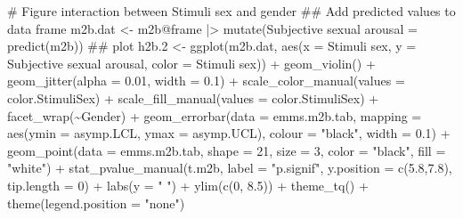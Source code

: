 \documentclass[
  bookmarksnumbered]{article}
\newenvironment{Shaded}{\begin{snugshade}}{\end{snugshade}}
\newcommand{\AttributeTok}[1]{\textcolor[rgb]{0.80,0.80,0.80}{#1}}
\newcommand{\CommentTok}[1]{\textcolor[rgb]{0.50,0.62,0.50}{#1}}
\newcommand{\DecValTok}[1]{\textcolor[rgb]{0.86,0.86,0.80}{#1}}
\newcommand{\DocumentationTok}[1]{\textcolor[rgb]{0.50,0.62,0.50}{#1}}
\newcommand{\FloatTok}[1]{\textcolor[rgb]{0.75,0.75,0.82}{#1}}
\newcommand{\FunctionTok}[1]{\textcolor[rgb]{0.94,0.94,0.56}{#1}}
\newcommand{\NormalTok}[1]{\textcolor[rgb]{0.80,0.80,0.80}{#1}}
\newcommand{\OtherTok}[1]{\textcolor[rgb]{0.94,0.94,0.56}{#1}}
\newcommand{\SpecialCharTok}[1]{\textcolor[rgb]{0.86,0.64,0.64}{#1}}
\newcommand{\StringTok}[1]{\textcolor[rgb]{0.80,0.58,0.58}{#1}}
\begin{document}
\begin{Shaded}
\begin{Highlighting}[]
\CommentTok{\# Figure interaction between Stimuli sex and gender}
\DocumentationTok{\#\# Add predicted values to data frame}
\NormalTok{m2b.dat }\OtherTok{\textless{}{-}}\NormalTok{ m2b}\SpecialCharTok{@}\NormalTok{frame }\SpecialCharTok{|\textgreater{}} 
  \FunctionTok{mutate}\NormalTok{(}\StringTok{\textasciigrave{}}\AttributeTok{Subjective sexual arousal}\StringTok{\textasciigrave{}} \OtherTok{=} \FunctionTok{predict}\NormalTok{(m2b))}
\DocumentationTok{\#\# plot}
\NormalTok{h2b}\FloatTok{.2} \OtherTok{\textless{}{-}} \FunctionTok{ggplot}\NormalTok{(m2b.dat, }\FunctionTok{aes}\NormalTok{(}\AttributeTok{x =} \StringTok{\textasciigrave{}}\AttributeTok{Stimuli sex}\StringTok{\textasciigrave{}}\NormalTok{, }
                             \AttributeTok{y =} \StringTok{\textasciigrave{}}\AttributeTok{Subjective sexual arousal}\StringTok{\textasciigrave{}}\NormalTok{, }
                             \AttributeTok{color =} \StringTok{\textasciigrave{}}\AttributeTok{Stimuli sex}\StringTok{\textasciigrave{}}\NormalTok{)) }\SpecialCharTok{+}
  \FunctionTok{geom\_violin}\NormalTok{() }\SpecialCharTok{+}
  \FunctionTok{geom\_jitter}\NormalTok{(}\AttributeTok{alpha =} \FloatTok{0.01}\NormalTok{, }\AttributeTok{width =} \FloatTok{0.1}\NormalTok{) }\SpecialCharTok{+}
  \FunctionTok{scale\_color\_manual}\NormalTok{(}\AttributeTok{values =}\NormalTok{ color.StimuliSex) }\SpecialCharTok{+}
  \FunctionTok{scale\_fill\_manual}\NormalTok{(}\AttributeTok{values =}\NormalTok{ color.StimuliSex) }\SpecialCharTok{+}
  \FunctionTok{facet\_wrap}\NormalTok{(}\SpecialCharTok{\textasciitilde{}}\NormalTok{Gender) }\SpecialCharTok{+}
  \FunctionTok{geom\_errorbar}\NormalTok{(}\AttributeTok{data =}\NormalTok{ emms.m2b.tab, }
                \AttributeTok{mapping =} \FunctionTok{aes}\NormalTok{(}\AttributeTok{ymin =}\NormalTok{ asymp.LCL, }\AttributeTok{ymax =}\NormalTok{ asymp.UCL), }
                \AttributeTok{colour =} \StringTok{"black"}\NormalTok{, }\AttributeTok{width =} \FloatTok{0.1}\NormalTok{) }\SpecialCharTok{+}
  \FunctionTok{geom\_point}\NormalTok{(}\AttributeTok{data =}\NormalTok{ emms.m2b.tab, }
             \AttributeTok{shape =} \DecValTok{21}\NormalTok{, }\AttributeTok{size =} \DecValTok{3}\NormalTok{,}
             \AttributeTok{color =} \StringTok{"black"}\NormalTok{, }\AttributeTok{fill =} \StringTok{"white"}\NormalTok{) }\SpecialCharTok{+}
  \FunctionTok{stat\_pvalue\_manual}\NormalTok{(t.m2b, }
                     \AttributeTok{label =} \StringTok{"p.signif"}\NormalTok{, }
                     \AttributeTok{y.position =} \FunctionTok{c}\NormalTok{(}\FloatTok{5.8}\NormalTok{,}\FloatTok{7.8}\NormalTok{), }
                     \AttributeTok{tip.length =} \DecValTok{0}\NormalTok{) }\SpecialCharTok{+}
  \FunctionTok{labs}\NormalTok{(}\AttributeTok{y =} \StringTok{" "}\NormalTok{) }\SpecialCharTok{+}
  \FunctionTok{ylim}\NormalTok{(}\FunctionTok{c}\NormalTok{(}\DecValTok{0}\NormalTok{, }\FloatTok{8.5}\NormalTok{)) }\SpecialCharTok{+}
  \FunctionTok{theme\_tq}\NormalTok{() }\SpecialCharTok{+}
  \FunctionTok{theme}\NormalTok{(}\AttributeTok{legend.position =} \StringTok{"none"}\NormalTok{)}


\end{Highlighting}
\end{Shaded}
\end{document}
